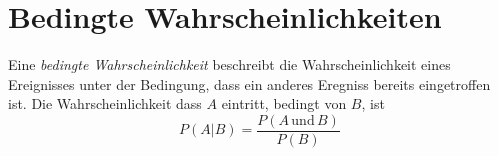 \documentclass{article}
\begin{document}
 
\section{Bedingte Wahrscheinlichkeiten}
Eine \emph{bedingte Wahrscheinlichkeit} beschreibt die Wahrscheinlichkeit eines Ereignisses unter der Bedingung, dass ein anderes Eregniss bereits eingetroffen ist. Die Wahrscheinlichkeit dass $A$ eintritt, bedingt von $B$, ist 
\[ 
 P(A|B) = \frac{P(A \,\text{und}\, B)}{P(B)}
\] 
\end{document}
